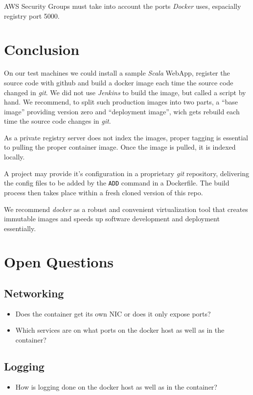 \documentclass[captions=tableheading]{article}
\begin{document}
AWS Security Groups must take into account the ports \emph{Docker} uses, espacially registry port 5000.
\section{Conclusion}
\label{sec-8}

On our test machines we could install a sample \emph{Scala} WebApp, register the source code with github and build a docker image each time the source code changed in \emph{git}. We did not use \emph{Jenkins} to build the image, but called a script by hand. 
We recommend, to split such production images into two parts, a ``base image'' providing version zero and ``deployment image'', wich gets rebuild each time the source code changes in \emph{git}. 

As a private registry server does not index the images, proper tagging is essential to pulling the proper container image. Once the image is pulled, it is indexed locally.

A project may provide it's configuration in a proprietary \emph{git} repository, delivering the config files to be added by the \texttt{ADD} command in a Dockerfile. The build process then takes place within a fresh cloned version of this repo. 

We recommend \emph{docker} as a robust and convenient virtualization tool that creates immutable images and speeds up software development and deployment essentially.  
\section{Open Questions}
\label{sec-9}
\subsection{Networking}
\label{sec-9-1}

\begin{itemize}
\item Does the container get its own NIC or does it only expose ports?
\item Which services are on what ports on the docker host as well as in the container?
\end{itemize}
\subsection{Logging}
\label{sec-9-2}

\begin{itemize}
\item How is logging done on the docker host as well as in the container?
\end{itemize}
\end{document}
